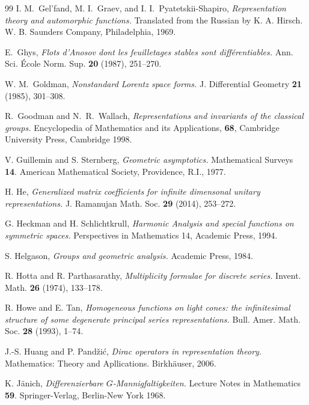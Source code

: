 \documentclass[10]{amsart}
\theoremstyle{remark}
\theoremstyle{definition}
\numberwithin{equation}{section}
\begin{document}
{\begin{thebibliography}{99}
 I. M.~Gel'fand, M. I.~Graev, and I. I.~Pyatetskii-Shapiro, {\em Representation theory and automorphic functions.} Translated from the Russian by K. A. Hirsch. W. B. Saunders Company, Philadelphia, 1969.

E.~Ghys, {\em Flots d'Anosov dont les feuilletages stables sont diff\' erentiables.} Ann. Sci. \' Ecole Norm. Sup. {\bf 20} (1987), 251--270.

 W. M.~Goldman, {\em Nonstandard Lorentz space forms.} J. Differential Geometry {\bf 21} (1985), 301--308.

 R.~Goodman and N.~R.~Wallach,  {\em Representations and invariants of the classical groups.} Encyclopedia of Mathematics and its Applications, {\bf 68}, Cambridge University Press, Cambridge 1998.
 
 V. Guillemin and S. Sternberg,  {\em Geometric asymptotics.} Mathematical Surveys {\bf 14}. American Mathematical Society, Providence, R.I., 1977.

 H. He,  {\em Generalized matrix coefficients for infinite dimensonal unitary representations.} J. Ramanujan Math. Soc. {\bf 29} (2014), 253--272.

 G. Heckman and H. Schlichtkrull, 
{\it Harmonic Analysis and special functions on symmetric spaces.} Perspectives in Mathematics 14, Academic Press, 1994.


 S. Helgason, {\it Groups and geometric analysis.} Academic Press, 1984.

 R. Hotta and R. Parthasarathy,  {\em Multiplicity formulae for discrete series.} Invent. Math. {\bf 26} (1974), 133--178.

 R. Howe and E. Tan,  {\em Homogeneous functions on light cones: the infinitesimal structure of some degenerate principal series representations.} Bull. Amer. Math. Soc. {\bf 28} (1993), 1--74.

 J.-S. Huang and P. Pand\v zi\' c, {\em Dirac operators in representation theory.} 
Mathematics: Theory and Apllications. Birkh\"auser, 2006.
 
 K. J\" anich,  {\em Differenzierbare $G$-Mannigfaltigkeiten.} Lecture Notes in Mathematics {\bf 59}. Springer-Verlag, Berlin-New York 1968.


\end{thebibliography}}
\end{document}
